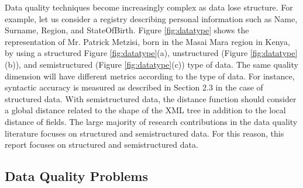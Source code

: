 \documentclass[pdftex,english,oribibl]{llncs}
\begin{document}
 Data quality techniques become increasingly complex as data lose structure. For example, let us consider a registry describing personal information such as Name, Surname, Region, and StateOfBirth. Figure \ref{fig:datatype} shows the representation of Mr. Patrick Metzisi, born in the Masai Mara region in Kenya, by using a structured Figure \ref{fig:datatype}(a), unstructured (Figure \ref{fig:datatype}(b)), and semistructured (Figure \ref{fig:datatype}(c)) type of data. The same quality dimension will have different metrics according to the type of data. For instance, syntactic accuracy is measured as described in Section 2.3 in the case of structured data. With semistructured data, the distance function should consider a global distance related to the shape of the XML tree in addition to the local distance of fields.
 The large majority of research contributions in the data quality literature focuses on structured and semistructured data. For this reason, this report focuses on structured and semistructured data.

\subsection{Data Quality Problems}
\end{document}
